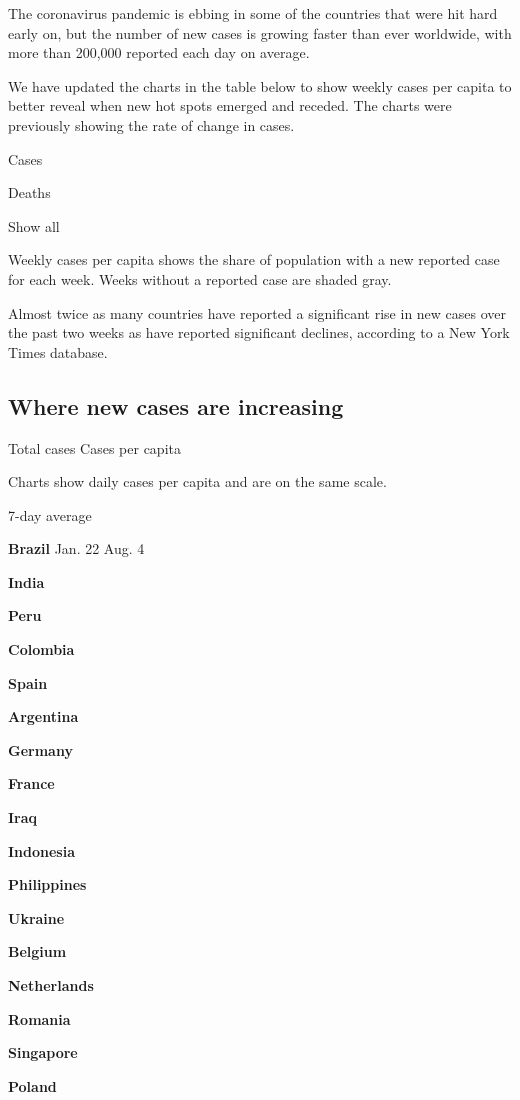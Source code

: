The coronavirus pandemic is ebbing in some of the countries that were
hit hard early on, but the number of new cases is growing faster than
ever worldwide, with more than 200,000 reported each day on average.

We have updated the charts in the table below to show weekly cases per
capita to better reveal when new hot spots emerged and receded. The
charts were previously showing the rate of change in cases.

Cases

Deaths

Show all

Weekly cases per capita shows the share of population with a new
reported case for each week. Weeks without a reported case are shaded
gray.

Almost twice as many countries have reported a significant rise in new
cases over the past two weeks as have reported significant declines,
according to a New York Times database.

\hypertarget{where-new-cases-are-increasing}{%
\subsection{Where new cases are
increasing}\label{where-new-cases-are-increasing}}

Total cases Cases per capita

Charts show daily cases per capita and are on the same scale.

7-day average

\textbf{Brazil} Jan. 22 Aug. 4

\textbf{India}

\textbf{Peru}

\textbf{Colombia}

\textbf{Spain}

\textbf{Argentina}

\textbf{Germany}

\textbf{France}

\textbf{Iraq}

\textbf{Indonesia}

\textbf{Philippines}

\textbf{Ukraine}

\textbf{Belgium}

\textbf{Netherlands}

\textbf{Romania}

\textbf{Singapore}

\textbf{Poland}

